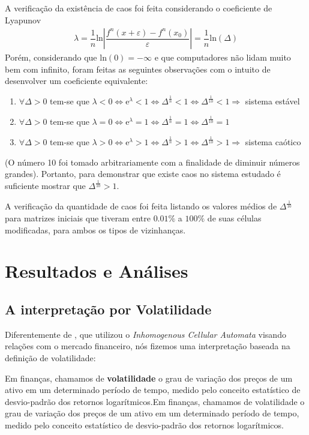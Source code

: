 \documentclass[
	12pt,				%
	openright,			%
	twoside,			%
	a4paper,			%
	english,			%
	french,				%
	spanish,			%
	brazil				%
	]{abntex2}
\begin{document}
  A verificação da existência de caos foi feita considerando o coeficiente de Lyapunov
  \begin{align}
    \lambda = \dfrac{1}{n} \mathrm{ln}\left|\dfrac{f^n(x+\varepsilon) - f^n(x_0)}{\varepsilon}\right| = \dfrac{1}{n} \mathrm{ln}(\Delta)
  \end{align}
  Porém, considerando que $\mathrm{ln}(0)=-\infty$ e que computadores não lidam muito bem com infinito, foram feitas as seguintes observações com o intuito de desenvolver um coeficiente equivalente:
  \begin{enumerate}
    \item $\forall \Delta > 0$ tem-se que $\lambda < 0 \Leftrightarrow \mathrm{e}^\lambda < 1 \Leftrightarrow \Delta^\frac{1}{n} < 1 \Leftrightarrow \Delta^\frac{1}{10} < 1 \Rightarrow$ sistema estável 
    \item $\forall \Delta > 0$ tem-se que $\lambda = 0 \Leftrightarrow \mathrm{e}^\lambda = 1 \Leftrightarrow \Delta^\frac{1}{n} = 1 \Leftrightarrow \Delta^\frac{1}{10} = 1$ 
    \item $\forall \Delta > 0$ tem-se que $\lambda > 0 \Leftrightarrow \mathrm{e}^\lambda > 1 \Leftrightarrow \Delta^\frac{1}{n} > 1 \Leftrightarrow \Delta^\frac{1}{10} > 1 \Rightarrow$ sistema caótico 
  \end{enumerate}
 (O número 10 foi tomado arbitrariamente com a finalidade de diminuir números grandes). Portanto, para demonstrar que existe caos no sistema estudado é suficiente mostrar que $\Delta^\frac{1}{10} > 1$. 
 
 A verificação da quantidade de caos foi feita listando os valores médios de $\Delta^\frac{1}{10}$ para matrizes iniciais que tiveram entre $0.01\%$ a $100\%$ de suas células modificadas, para ambos os tipos de vizinhanças.



\chapter{Resultados e Análises}

\section{A interpretação por Volatilidade}

Diferentemente de , que utilizou o \textit{Inhomogenous Cellular Automata} visando relações com o mercado financeiro, nós fizemos uma interpretação baseada na definição de volatilidade:
\begin{citacao}
  Em finanças, chamamos de \textbf{volatilidade} o grau de variação dos preços de um ativo em
um determinado período de tempo, medido pelo conceito estatístico de desvio-padrão dos
retornos logarítmicos.Em finanças, chamamos de volatilidade o grau de variação dos preços de um ativo em
um determinado período de tempo, medido pelo conceito estatístico de desvio-padrão dos
retornos logarítmicos. \cite{anbima3}
\end{citacao}
\end{document}
